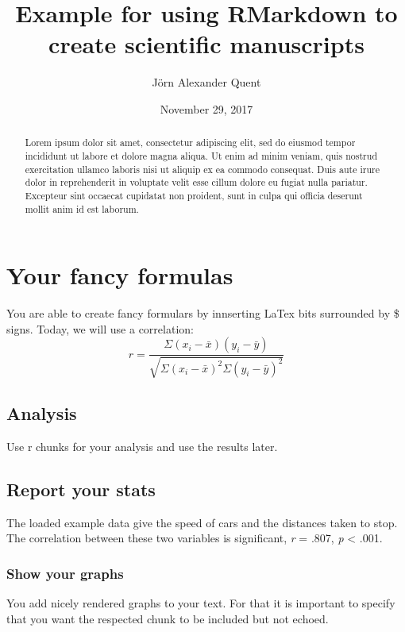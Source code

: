 \documentclass[12pt,]{article}
\title{Example for using RMarkdown to create scientific manuscripts}
\author{Jörn Alexander Quent}
\date{November 29, 2017}
\begin{document}
\maketitle
\begin{abstract}
Lorem ipsum dolor sit amet, consectetur adipiscing elit, sed do eiusmod
tempor incididunt ut labore et dolore magna aliqua. Ut enim ad minim
veniam, quis nostrud exercitation ullamco laboris nisi ut aliquip ex ea
commodo consequat. Duis aute irure dolor in reprehenderit in voluptate
velit esse cillum dolore eu fugiat nulla pariatur. Excepteur sint
occaecat cupidatat non proident, sunt in culpa qui officia deserunt
mollit anim id est laborum.
\end{abstract}

{
\setcounter{tocdepth}{3}
\tableofcontents
}
\section{Your fancy formulas}\label{your-fancy-formulas}

You are able to create fancy formulars by innserting LaTex bits
surrounded by \$ signs. Today, we will use a correlation:
\[r = \frac{\Sigma(x_i - \bar{x})(y_i - \bar{y})}{\sqrt{\Sigma(x_i - \bar{x})^2\Sigma(y_i - \bar{y})^2}}\]

\subsection{Analysis}\label{analysis}

Use r chunks for your analysis and use the results later.

\subsection{Report your stats}\label{report-your-stats}

The loaded example data give the speed of cars and the distances taken
to stop. The correlation between these two variables is significant,
\emph{r} = .807, \emph{p} \textless{} .001.

\subsubsection{Show your graphs}\label{show-your-graphs}

You add nicely rendered graphs to your text. For that it is important to
specify that you want the respected chunk to be included but not echoed.
\end{document}
